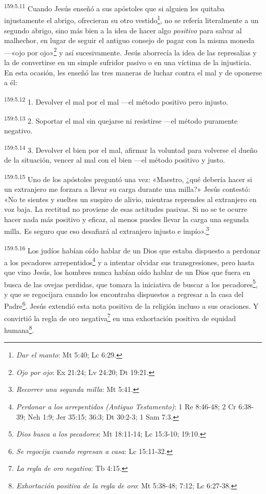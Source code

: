 \par 
\textsuperscript{159:5.11} Cuando Jesús enseñó a sus apóstoles que si alguien les quitaba injustamente el abrigo, ofrecieran su otro vestido\footnote{\textit{Dar el manto}: Mt 5:40; Lc 6:29.}, no se refería literalmente a un segundo abrigo, sino más bien a la idea de hacer algo \textit{positivo} para salvar al malhechor, en lugar de seguir el antiguo consejo de pagar con la misma moneda ---«ojo por ojo»\footnote{\textit{Ojo por ojo}: Ex 21:24; Lv 24:20; Dt 19:21.} y así sucesivamente. Jesús aborrecía la idea de las represalias y la de convertirse en un simple sufridor pasivo o en una víctima de la injusticia. En esta ocasión, les enseñó las tres maneras de luchar contra el mal y de oponerse a él:

\par 
\textsuperscript{159:5.12} 1. Devolver el mal por el mal ---el método positivo pero injusto.

\par 
\textsuperscript{159:5.13} 2. Soportar el mal sin quejarse ni resistirse ---el método puramente negativo.

\par 
\textsuperscript{159:5.14} 3. Devolver el bien por el mal, afirmar la voluntad para volverse el dueño de la situación, vencer al mal con el bien ---el método positivo y justo.

\par 
\textsuperscript{159:5.15} Uno de los apóstoles preguntó una vez: «Maestro, ¿qué debería hacer si un extranjero me forzara a llevar su carga durante una milla?» Jesús contestó: «No te sientes y sueltes un suspiro de alivio, mientras reprendes al extranjero en voz baja. La rectitud no proviene de esas actitudes pasivas. Si no se te ocurre hacer nada más positivo y eficaz, al menos puedes llevar la carga una segunda milla. Es seguro que eso desafiará al extranjero injusto e impío».\footnote{\textit{Recorrer una segunda milla}: Mt 5:41.}

\par 
\textsuperscript{159:5.16} Los judíos habían oído hablar de un Dios que estaba dispuesto a perdonar a los pecadores arrepentidos\footnote{\textit{Perdonar a los arrepentidos (Antiguo Testamento)}: 1 Re 8:46-48; 2 Cr 6:38-39; Neh 1:9; Jer 35:15; 36:3; Dt 30:2-3; 1 Sam 7:3.} y a intentar olvidar sus transgresiones, pero hasta que vino Jesús, los hombres nunca habían oído hablar de un Dios que fuera en busca de las ovejas perdidas, que tomara la iniciativa de buscar a los pecadores\footnote{\textit{Dios busca a los pecadores}: Mt 18:11-14; Lc 15:3-10; 19:10.}, y que se regocijara cuando los encontraba dispuestos a regresar a la casa del Padre\footnote{\textit{Se regocija cuando regresan a casa}: Lc 15:11-32.}. Jesús extendió esta nota positiva de la religión incluso a sus oraciones. Y convirtió la regla de oro negativa\footnote{\textit{La regla de oro negativa}: Tb 4:15.} en una exhortación positiva de equidad humana\footnote{\textit{Exhortación positiva de la regla de oro}: Mt 5:38-48; 7:12; Lc 6:27-38.}.

